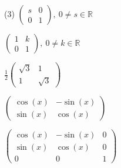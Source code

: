 \documentclass{article}
\begin{document}
\begin{tasks}[label-width=1.5em](3)
  \task $
  \begin{pmatrix} s & 0 \\ 0 & 1
  \end{pmatrix},\ 0\neq s \in\mathbb{R}$

  \task $
  \begin{pmatrix} 1 & k \\ 0 & 1
  \end{pmatrix},\ 0\neq k \in\mathbb{R}$

  \task $
  \frac{1}{2}
  \begin{pmatrix} \sqrt{3} & 1 \\ 1 & \sqrt{3}
  \end{pmatrix}$

  \task $
  \begin{pmatrix} \cos(x) & -\sin(x) \\ \sin(x) & \cos(x)
  \end{pmatrix}$

  \task $
  \begin{pmatrix} \cos(x) & -\sin(x) & 0 \\ \sin(x) & \cos(x) & 0 \\ 0 & 0 & 1
  \end{pmatrix}$
\end{tasks}
\end{document}
